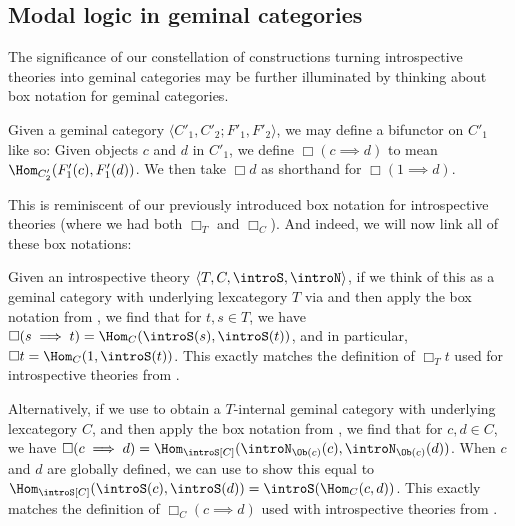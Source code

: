 \subsection{Modal logic in geminal categories}

The significance of our constellation of constructions turning introspective theories into geminal categories may be further illuminated by thinking about box notation for geminal categories.

\begin{definition}\label{BoxForGeminal}
Given a geminal category $\langle C'_1, C'_2; F'_1, F'_2 \rangle$, we may define a bifunctor on $C'_1$ like so: Given objects $c$ and $d$ in $C'_1$, we define $\Box(c \implies d)$ to mean $\Hom_{C'_2}(F'_1(c), F'_1(d))$. We then take $\Box d$ as shorthand for $\Box(1 \implies d)$.
\end{definition}

This is reminiscent of our previously introduced box notation for introspective theories (where we had both $\Box_T$ and $\Box_C$). And indeed, we will now link all of these box notations:

\begin{observation}
Given an introspective theory $\langle T, C, \introS, \introN \rangle$, if we think of this as a geminal category with underlying lexcategory $T$ via  and then apply the box notation from , we find that for $t, s \in T$, we have $\Box(s \implies t) = \Hom_C(\introS(s), \introS(t))$, and in particular, $\Box t = \Hom_C(1, \introS(t))$. This exactly matches the definition of $\Box_T t$ used for introspective theories from .

Alternatively, if we use  to obtain a $T$-internal geminal category with underlying lexcategory $C$, and then apply the box notation from , we find that for $c, d \in C$, we have $\Box(c \implies d) = \Hom_{\introS[C]}(\introN_{\Ob(c)}(c), \introN_{\Ob(c)}(d))$. When $c$ and $d$ are globally defined, we can use  to show this equal to $\Hom_{\introS[C]}(\introS(c), \introS(d)) =  \introS(\Hom_C(c, d))$. This exactly matches the definition of $\Box_C (c \implies d)$ used with introspective theories from .

\end{observation}

